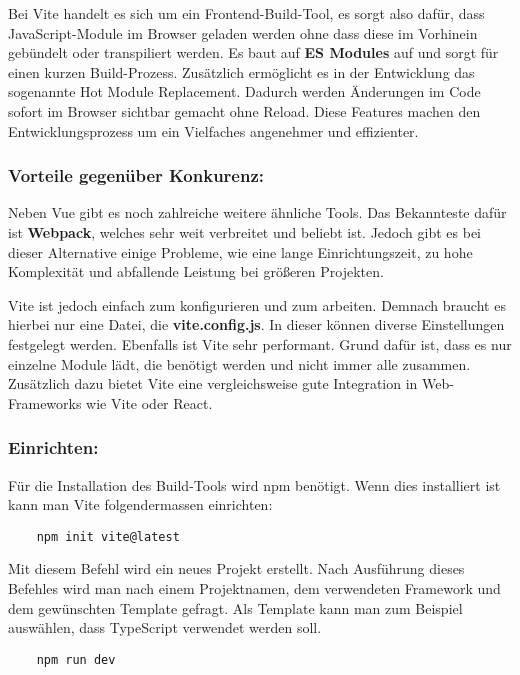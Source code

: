 Bei Vite handelt es sich um ein Frontend-Build-Tool, es sorgt also dafür, dass JavaScript-Module im Browser geladen werden ohne dass diese im Vorhinein gebündelt oder transpiliert werden. Es baut auf \textbf{ES Modules} auf und sorgt für einen kurzen Build-Prozess. Zusätzlich ermöglicht es in der Entwicklung das sogenannte Hot Module Replacement. Dadurch werden Änderungen im Code sofort im Browser sichtbar gemacht ohne Reload. Diese Features machen den Entwicklungsprozess um ein Vielfaches angenehmer und effizienter.
\cite{frontend_vite}

\subsubsection{Vorteile gegenüber Konkurenz:}
Neben Vue gibt es noch zahlreiche weitere ähnliche Tools. Das Bekannteste dafür ist \textbf{Webpack}, welches sehr weit verbreitet und beliebt ist. Jedoch gibt es bei dieser Alternative einige Probleme, wie eine lange Einrichtungszeit, zu hohe Komplexität und abfallende Leistung bei größeren Projekten.

Vite ist jedoch einfach zum konfigurieren und zum arbeiten. Demnach braucht es hierbei nur eine  Datei, die \textbf{vite.config.js}. In dieser können diverse Einstellungen festgelegt werden. Ebenfalls ist Vite sehr performant. Grund dafür ist, dass es nur einzelne Module lädt, die benötigt werden und nicht immer alle zusammen. Zusätzlich dazu bietet Vite eine vergleichsweise gute Integration in Web-Frameworks wie Vite oder React.
\cite{frontend_vite}

\subsubsection{Einrichten:}
Für die Installation des Build-Tools wird npm benötigt. Wenn dies installiert ist kann man Vite folgendermassen einrichten:

\begin{lstlisting}
    npm init vite@latest
\end{lstlisting}

Mit diesem Befehl wird ein neues Projekt erstellt. Nach Ausführung dieses Befehles wird man nach einem Projektnamen, dem verwendeten Framework und dem gewünschten Template gefragt. Als Template kann man zum Beispiel auswählen, dass TypeScript verwendet werden soll.

\begin{lstlisting}
    npm run dev
\end{lstlisting}

